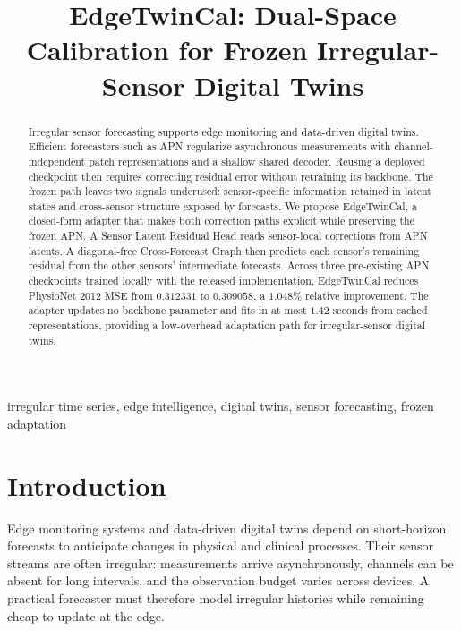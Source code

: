 \documentclass[conference]{IEEEtran}
\begin{document}
\title{EdgeTwinCal: Dual-Space Calibration for Frozen Irregular-Sensor Digital Twins}

\author{
}

\maketitle

\begin{abstract}
Irregular sensor forecasting supports edge monitoring and data-driven digital twins. Efficient forecasters such as APN regularize asynchronous measurements with channel-independent patch representations and a shallow shared decoder. Reusing a deployed checkpoint then requires correcting residual error without retraining its backbone. The frozen path leaves two signals underused: sensor-specific information retained in latent states and cross-sensor structure exposed by forecasts. We propose EdgeTwinCal, a closed-form adapter that makes both correction paths explicit while preserving the frozen APN. A Sensor Latent Residual Head reads sensor-local corrections from APN latents. A diagonal-free Cross-Forecast Graph then predicts each sensor's remaining residual from the other sensors' intermediate forecasts. Across three pre-existing APN checkpoints trained locally with the released implementation, EdgeTwinCal reduces PhysioNet 2012 MSE from $0.312331$ to $0.309058$, a $1.048\%$ relative improvement. The adapter updates no backbone parameter and fits in at most $1.42$ seconds from cached representations, providing a low-overhead adaptation path for irregular-sensor digital twins.
\end{abstract}

\begin{IEEEkeywords}
irregular time series, edge intelligence, digital twins, sensor forecasting, frozen adaptation
\end{IEEEkeywords}

\section{Introduction}
Edge monitoring systems and data-driven digital twins depend on short-horizon forecasts to anticipate changes in physical and clinical processes. Their sensor streams are often irregular: measurements arrive asynchronously, channels can be absent for long intervals, and the observation budget varies across devices. A practical forecaster must therefore model irregular histories while remaining cheap to update at the edge.
\end{document}
